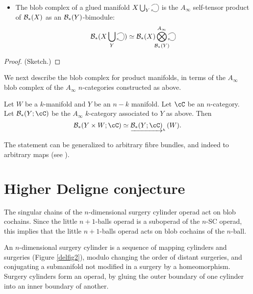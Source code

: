 \documentclass{pnastwo}
\begin{document}
\begin{article}
\begin{thm}
\begin{itemize}
\item The blob complex of a glued manifold $X\bigcup_Y \selfarrow$ is the $A_\infty$ self-tensor product of
${\mathcal B}_*(X)$ as an ${\mathcal B}_*(Y)$-bimodule:
\begin{equation*}
\bc_*(X\bigcup_Y \selfarrow) \simeq \bc_*(X) \Tensor^{A_\infty}_{\mathclap{\bc_*(Y)}} \selfarrow
\end{equation*}
\end{itemize}
\end{thm}

\begin{proof} (Sketch.)

\end{proof}

We next describe the blob complex for product manifolds, in terms of the $A_\infty$ blob complex of the $A_\infty$ $n$-categories constructed as above.

\begin{thm}
\label{thm:product}
Let $W$ be a $k$-manifold and $Y$ be an $n-k$ manifold.
Let $\cC$ be an $n$-category.
Let $\bc_*(Y;\cC)$ be the $A_\infty$ $k$-category associated to $Y$ as above.
Then
\[
	\bc_*(Y\times W; \cC) \simeq \clh{\bc_*(Y;\cC)}(W).
\]
\end{thm}
The statement can be generalized to arbitrary fibre bundles, and indeed to arbitrary maps
(see \cite[\S7.1]{1009.5025}).


\section{Higher Deligne conjecture}
\label{sec:applications}

\begin{thm}
\label{thm:deligne}
The singular chains of the $n$-dimensional surgery cylinder operad act on blob cochains.
Since the little $n{+}1$-balls operad is a suboperad of the $n$-SC operad,
this implies that the little $n{+}1$-balls operad acts on blob cochains of the $n$-ball.
\end{thm}

An $n$-dimensional surgery cylinder is a sequence of mapping cylinders and surgeries (Figure \ref{delfig2}), 
modulo changing the order of distant surgeries, and conjugating a submanifold not modified in a surgery by a homeomorphism. 
Surgery cylinders form an operad, by gluing the outer boundary of one cylinder into an inner boundary of another.


\end{article}
\end{document}
